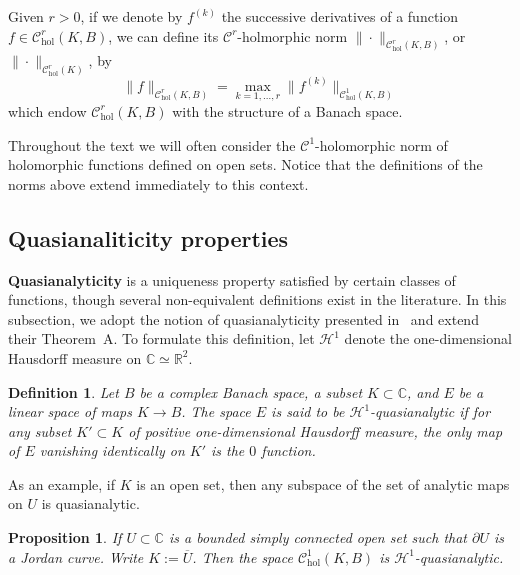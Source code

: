 \documentclass[10pt]{article}
\newtheorem{definition}[theorem]{Definition}
\newtheorem{proposition}[theorem]{Proposition}
\newcommand{\CC}{\mathbb{C}}
\begin{document}
Given $r>0$, if we denote by $f^{(k)}$ the successive derivatives of a function $f\in  \mathscr C^r_{\text{hol}}(K,B)$, we can define its $\mathscr C^r$-holmorphic norm $\|\cdot\|_{\mathscr C^r_{\text{hol}}(K,B)}$, or $\|\cdot\|_{\mathscr C^r_{\text{hol}}(K)}$, by 
\[
\|f\|_{\mathscr C^r_{\text{hol}}(K,B)} = \max_{k=1,\ldots,r} \|f^{(k)}\|_{\mathscr C^1_{\text{hol}}(K,B)}
\]
which endow $\mathscr C^r_{\text{hol}}(K,B)$ with the structure of a Banach space.

Throughout the text we will often consider the $\mathscr C^1$-holomorphic norm of holomorphic functions defined on open sets. Notice that the definitions of the norms above extend immediately to this context. 


\subsection{Quasianaliticity properties}
\label{sc:quasianalytic}
\textbf{Quasianalyticity} is a uniqueness property satisfied by certain classes of functions, though several non-equivalent definitions exist in the literature. In this subsection, we adopt the notion of quasianalyticity presented in~\cite[Definition $1$]{MarmiSauzin_2011} and extend their Theorem~A.
To formulate this definition, let $\mathscr{H}^1$ denote the one-dimensional Hausdorff measure on $\mathbb{C} \simeq \mathbb{R}^2$.


\begin{definition}
    Let $B$ be a complex Banach space, a subset $K\subset\CC$, and $E$ be a linear space of maps $K\to B$. The space $E$ is said to be \textit{$\mathscr H^1$-quasianalytic} if for any subset $K'\subset K$ of positive one-dimensional Hausdorff measure, the only map of $E$ vanishing identically on $K'$ is the $0$ function.
\end{definition}

As an example, if $K$ is an open set, then any subspace of the set of analytic maps on $U$ is quasianalytic.

\begin{proposition}
\label{proposition:simply_connected_quasianalytic}
    If $U\subset \CC$ is a bounded simply connected open set such that $\partial U$ is a Jordan curve. Write $K:=\overline U$. Then the space $\mathscr C^1_{\text{hol}}(K,B)$ is $\mathscr H^1$-quasianalytic.
\end{proposition}
\end{document}
